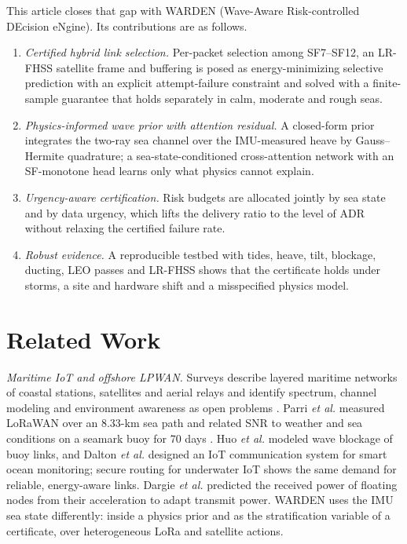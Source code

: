 \documentclass[journal]{IEEEtran}\def\WARDENieee{1}%
\begin{document}
This article closes that gap with WARDEN (Wave-Aware Risk-controlled DEcision eNgine). Its contributions are as follows.
\begin{enumerate}
\item \emph{Certified hybrid link selection.} Per-packet selection among SF7--SF12, an LR-FHSS satellite frame and buffering is posed as energy-minimizing selective prediction with an explicit attempt-failure constraint and solved with a finite-sample guarantee that holds separately in calm, moderate and rough seas.
\item \emph{Physics-informed wave prior with attention residual.} A closed-form prior integrates the two-ray sea channel over the IMU-measured heave by Gauss--Hermite quadrature; a sea-state-conditioned cross-attention network with an SF-monotone head learns only what physics cannot explain.
\item \emph{Urgency-aware certification.} Risk budgets are allocated jointly by sea state and by data urgency, which lifts the delivery ratio to the level of ADR without relaxing the certified failure rate.
\item \emph{Robust evidence.} A reproducible testbed with tides, heave, tilt, blockage, ducting, LEO passes and LR-FHSS shows that the certificate holds under storms, a site and hardware shift and a misspecified physics model.
\end{enumerate}

\section{Related Work}
\emph{Maritime IoT and offshore LPWAN.} Surveys describe layered maritime networks of coastal stations, satellites and aerial relays and identify spectrum, channel modeling and environment awareness as open problems \cite{b1,b2,b3,b4}. Parri \emph{et al.} measured LoRaWAN over an 8.33-km sea path \cite{b36} and related SNR to weather and sea conditions on a seamark buoy for 70 days \cite{b5}. Huo \emph{et al.} \cite{b8} modeled wave blockage of buoy links, and Dalton \emph{et al.} \cite{b37} designed an IoT communication system for smart ocean monitoring; secure routing for underwater IoT \cite{b38} shows the same demand for reliable, energy-aware links. Dargie \emph{et al.} \cite{b28} predicted the received power of floating nodes from their acceleration to adapt transmit power. WARDEN uses the IMU sea state differently: inside a physics prior and as the stratification variable of a certificate, over heterogeneous LoRa and satellite actions.
\end{document}
